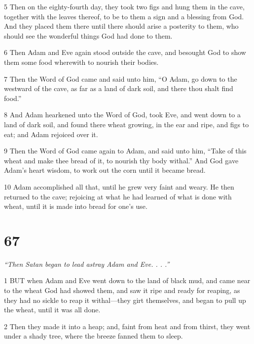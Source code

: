 \par 5 Then on the eighty-fourth day, they took two figs and hung them in the cave, together with the leaves thereof, to be to them a sign and a blessing from God. And they placed them there until there should arise a posterity to them, who should see the wonderful things God had done to them.

\par 6 Then Adam and Eve again stood outside the cave, and besought God to show them some food wherewith to nourish their bodies.

\par 7 Then the Word of God came and said unto him, “O Adam, go down to the westward of the cave, as far as a land of dark soil, and there thou shalt find food.”

\par 8 And Adam hearkened unto the Word of God, took Eve, and went down to a land of dark soil, and found there wheat growing, in the ear and ripe, and figs to eat; and Adam rejoiced over it.

\par 9 Then the Word of God came again to Adam, and said unto him, “Take of this wheat and make thee bread of it, to nourish thy body withal.” And God gave Adam's heart wisdom, to work out the corn until it became bread.

\par 10 Adam accomplished all that, until he grew very faint and weary. He then returned to the cave; rejoicing at what he had learned of what is done with wheat, until it is made into bread for one's use.

\chapter{67}

\par \textit{“Then Satan began to lead astray Adam and Eve. . . .”}

\par 1 BUT when Adam and Eve went down to the land of black mud, and came near to the wheat God had showed them, and saw it ripe and ready for reaping, as they had no sickle to reap it withal—they girt themselves, and began to pull up the wheat, until it was all done.

\par 2 Then they made it into a heap; and, faint from heat and from thirst, they went under a shady tree, where the breeze fanned them to sleep.

